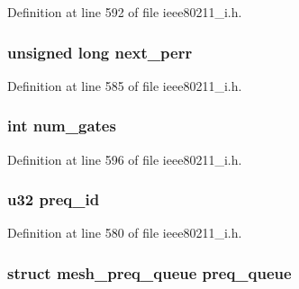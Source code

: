 Definition at line 592 of file ieee80211\-\_\-i.\-h.

\hypertarget{structieee80211__if__mesh_ae90d36efd492fcfe01281116836def4b}{
\subsubsection[{next\-\_\-perr}]{\setlength{\rightskip}{0pt plus 5cm}unsigned long next\-\_\-perr}}\label{structieee80211__if__mesh_ae90d36efd492fcfe01281116836def4b}


Definition at line 585 of file ieee80211\-\_\-i.\-h.

\hypertarget{structieee80211__if__mesh_af6554718fdcf2fe36e9eed14cc159ebf}{
\subsubsection[{num\-\_\-gates}]{\setlength{\rightskip}{0pt plus 5cm}int num\-\_\-gates}}\label{structieee80211__if__mesh_af6554718fdcf2fe36e9eed14cc159ebf}


Definition at line 596 of file ieee80211\-\_\-i.\-h.

\hypertarget{structieee80211__if__mesh_a892d957726166f4493acf446b312e7a0}{
\subsubsection[{preq\-\_\-id}]{\setlength{\rightskip}{0pt plus 5cm}u32 preq\-\_\-id}}\label{structieee80211__if__mesh_a892d957726166f4493acf446b312e7a0}


Definition at line 580 of file ieee80211\-\_\-i.\-h.

\hypertarget{structieee80211__if__mesh_ad73838a40d5e3d10af379c4fc37d4dfd}{
\subsubsection[{preq\-\_\-queue}]{\setlength{\rightskip}{0pt plus 5cm}struct {\bf mesh\-\_\-preq\-\_\-queue} preq\-\_\-queue}}\label{structieee80211__if__mesh_ad73838a40d5e3d10af379c4fc37d4dfd}


